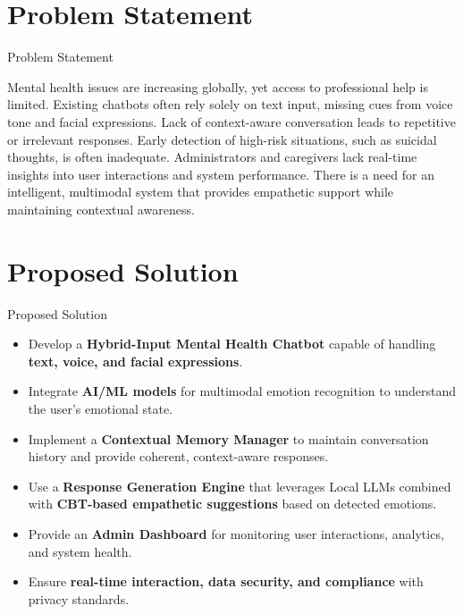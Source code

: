 \documentclass[11pt]{beamer}
\begin{document}
\section{Problem Statement}
\begin{frame}{Problem Statement}
    \large
    \begin{center}
        \begin{minipage}{0.9\textwidth}
            \justifying
            Mental health issues are increasing globally, yet access to professional help is limited. Existing chatbots often rely solely on text input, missing cues from voice tone and facial expressions. Lack of context-aware conversation leads to repetitive or irrelevant responses. Early detection of high-risk situations, such as suicidal thoughts, is often inadequate. Administrators and caregivers lack real-time insights into user interactions and system performance. There is a need for an intelligent, multimodal system that provides empathetic support while maintaining contextual awareness.
        \end{minipage}
    \end{center}
\end{frame}

\section{Proposed Solution}
\begin{frame}{Proposed Solution}
    \justifying
    \normalsize
    \begin{itemize}
        \item Develop a \textbf{Hybrid-Input Mental Health Chatbot} capable of handling \textbf{text, voice, and facial expressions}.
        \item Integrate \textbf{AI/ML models} for multimodal emotion recognition to understand the user's emotional state.
        \item Implement a \textbf{Contextual Memory Manager} to maintain conversation history and provide coherent, context-aware responses.
        \item Use a \textbf{Response Generation Engine} that leverages Local LLMs combined with \textbf{CBT-based empathetic suggestions} based on detected emotions.
        \item Provide an \textbf{Admin Dashboard} for monitoring user interactions, analytics, and system health.
        \item Ensure \textbf{real-time interaction, data security, and compliance} with privacy standards.
    \end{itemize}
\end{frame}
\end{document}
